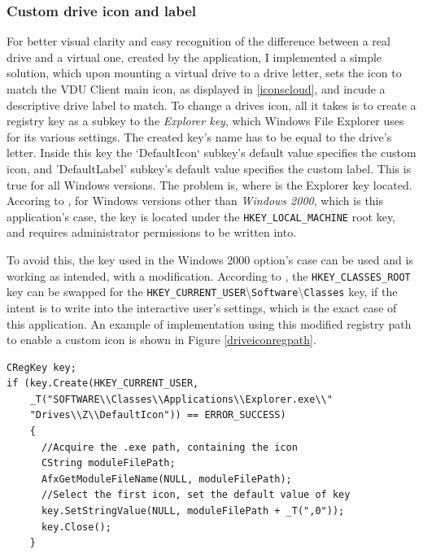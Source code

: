 \subsubsection{Custom drive icon and label}
For better visual clarity and easy recognition of the difference between a real drive and a virtual one, created by the application, I implemented a simple solution, which upon mounting a virtual drive to a drive letter, sets the icon to match the VDU Client main icon, as displayed in \ref{iconscloud}, and incude a descriptive drive label to match. To change a drives icon, all it takes is to create a registry key as a subkey to the \textit{Explorer key}, which Windows File Explorer uses for its various settings. The created key's name has to be equal to the drive's letter. Inside this key the `DefaultIcon` subkey's default value specifies the custom icon, and 'DefaultLabel' subkey's default value specifies the custom label. This is true for all Windows versions. The problem is, where is the Explorer key located. Accoring to \cite{WinDriveIcon}, for Windows versions other than \textit{Windows 2000}, which is this application's case, the key is located under the \lstinline{HKEY_LOCAL_MACHINE} root key, and requires administrator permissions to be written into. 

To avoid this, the key used in the Windows 2000 option's case can be used and is working as intended, with a modification. According to \cite{WinHKCRKey}, the \lstinline{HKEY_CLASSES_ROOT} key can be swapped for the \lstinline{HKEY_CURRENT_USER}\textbackslash{}\lstinline{Software}\textbackslash{}\lstinline{Classes} key, if the intent is to write into the interactive user's settings, which is the exact case of this application. An example of implementation using this modified registry path to enable a custom icon is shown in Figure \ref{driveiconregpath}.
\begin{lstlisting}[caption={Implementing a custom drive icon for drive Z, using without administrator permissions.}, label=driveiconregpath]
CRegKey key;
if (key.Create(HKEY_CURRENT_USER,
    _T("SOFTWARE\\Classes\\Applications\\Explorer.exe\\"
    "Drives\\Z\\DefaultIcon")) == ERROR_SUCCESS)
    {
      //Acquire the .exe path, containing the icon
      CString moduleFilePath;
      AfxGetModuleFileName(NULL, moduleFilePath);
      //Select the first icon, set the default value of key
      key.SetStringValue(NULL, moduleFilePath + _T(",0")); 
      key.Close();
    }
\end{lstlisting}

